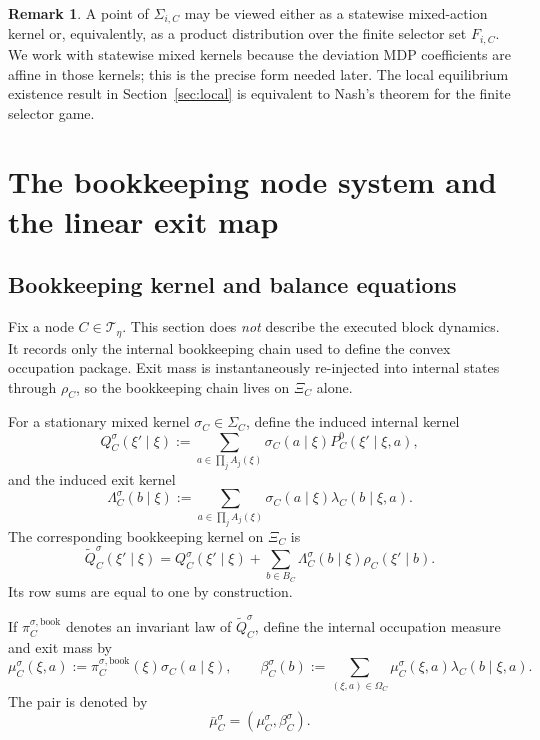 \documentclass[12pt]{article}
\theoremstyle{definition}
\newtheorem{remark}[theorem]{Remark}
\newcommand{\1}{\mathbf{1}}
\newcommand{\cT}{\mathcal{T}}
\begin{document}
\begin{remark}
A point of $\Sigma_{i,C}$ may be viewed either as a statewise mixed-action kernel
or, equivalently, as a product distribution over the finite selector set
$F_{i,C}$. We work with statewise mixed kernels because the deviation MDP
coefficients are affine in those kernels; this is the precise form needed later.
The local equilibrium existence result in Section~\ref{sec:local} is equivalent to
Nash's theorem for the finite selector game.
\end{remark}

\section{The bookkeeping node system and the linear exit map}
\label{sec:bookkeeping}

\subsection{Bookkeeping kernel and balance equations}

Fix a node $C\in\cT_\eta$. This section does \emph{not} describe the executed
block dynamics. It records only the internal bookkeeping chain used to define the
convex occupation package. Exit mass is instantaneously re-injected into internal
states through $\rho_C$, so the bookkeeping chain lives on $\Xi_C$ alone.

For a stationary mixed kernel $\sigma_C\in\Sigma_C$, define the induced internal
kernel
\[
Q_C^{\sigma}(\xi'\mid \xi)
:=
\sum_{a\in\prod_j A_j(\xi)} \sigma_C(a\mid \xi)
P_C^0(\xi'\mid \xi,a),
\]
and the induced exit kernel
\[
\Lambda_C^{\sigma}(b\mid\xi)
:=
\sum_{a\in\prod_j A_j(\xi)}\sigma_C(a\mid\xi)\lambda_C(b\mid\xi,a).
\]
The corresponding bookkeeping kernel on $\Xi_C$ is
\begin{equation}
\label{eq:bookkeeping-kernel}
\widetilde Q_C^{\sigma}(\xi'\mid \xi)
=
Q_C^{\sigma}(\xi'\mid \xi)
+
\sum_{b\in B_C}\Lambda_C^{\sigma}(b\mid \xi)\rho_C(\xi'\mid b).
\end{equation}
Its row sums are equal to one by construction.

If $\pi_C^{\sigma,\mathrm{book}}$ denotes an invariant law of
$\widetilde Q_C^{\sigma}$, define the internal occupation measure and exit mass by
\[
\mu_C^{\sigma}(\xi,a):=\pi_C^{\sigma,\mathrm{book}}(\xi)\sigma_C(a\mid\xi),
\qquad
\beta_C^{\sigma}(b):=\sum_{(\xi,a)\in\Omega_C}
\mu_C^{\sigma}(\xi,a)\lambda_C(b\mid\xi,a).
\]
The pair is denoted by
\[
\bar\mu_C^{\sigma}=(\mu_C^{\sigma},\beta_C^{\sigma}).
\]
\end{document}
